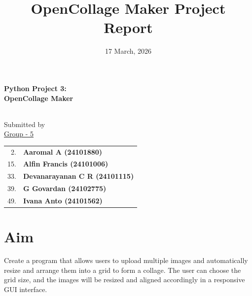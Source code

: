 \documentclass[a4paper]{article}
\begin{document}
\begin{titlepage}
    \centering
    \vspace*{1in}
    
    {\Large \textbf{Python Project 3:}} \\
    \vspace{0.4in}
    {\huge \textbf{OpenCollage Maker}} \\
    \vspace{0.6in}
     \\
    \vspace{0.8in}
    
    {\large Submitted by} \\
    \vspace{0.2in}
    {\large \underline{Group - 5}} \\
    \vspace{0.2in}
    
    {\large
    \begin{tabular}{rl}
         2. & \textbf{Aaromal A (24101880)} \\
        15. & \textbf{Alfin Francis (24101006)} \\
        33. & \textbf{Devanarayanan C R (24101115)} \\
        39. & \textbf{G Govardan (24102775)} \\
        49. & \textbf{Ivana Anto (24101562)}
    \end{tabular}}
    
    \vfill
\end{titlepage}
\restoregeometry %
\newpage

\title{OpenCollage Maker Project Report}
\author{}
\date{17 March, 2026}
\maketitle

\section*{Aim}
Create a program that allows users to upload multiple images and automatically resize and arrange them into a grid to form a collage. The user can choose the grid size, and the images will be resized and aligned accordingly in a responsive GUI interface.
\vspace{10pt}
\end{document}
